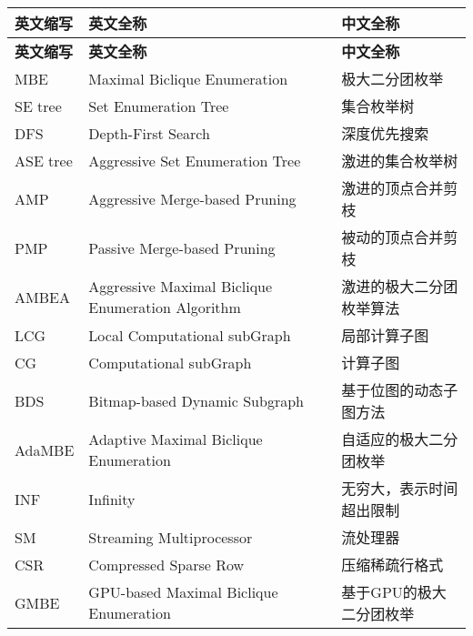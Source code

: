 \cleardoublepage
{}
\begin{center}
    \begin{longtable}{m{2cm}m{8cm}m{5cm}}
        \toprule
        \textbf{英文缩写}&\textbf{英文全称}&\textbf{中文全称}\\
        \midrule
        \endfirsthead
        \toprule
        \textbf{英文缩写}&\textbf{英文全称}&\textbf{中文全称}\\
        \midrule
        \endhead 
        \bottomrule
        \endfoot
        \bottomrule
        \endlastfoot
        MBE&Maximal Biclique Enumeration&极大二分团枚举\\
        SE tree&Set Enumeration Tree&集合枚举树\\
        DFS&Depth-First Search&深度优先搜索\\
        ASE tree&Aggressive Set Enumeration Tree&激进的集合枚举树\\
        AMP&Aggressive Merge-based Pruning&激进的顶点合并剪枝\\
        PMP&Passive Merge-based Pruning&被动的顶点合并剪枝\\
        AMBEA&Aggressive Maximal Biclique Enumeration Algorithm&激进的极大二分团枚举算法\\
        LCG&Local Computational subGraph&局部计算子图\\
        CG&Computational subGraph&计算子图\\
        BDS&Bitmap-based Dynamic Subgraph&基于位图的动态子图方法\\
        AdaMBE&Adaptive Maximal Biclique Enumeration & 自适应的极大二分团枚举\\
        INF&Infinity&无穷大，表示时间超出限制\\        
        SM&Streaming Multiprocessor & 流处理器\\
        CSR&Compressed Sparse Row& 压缩稀疏行格式\\
        GMBE&GPU-based Maximal Biclique Enumeration & 基于GPU的极大二分团枚举\\
        

	\end{longtable}
\end{center}